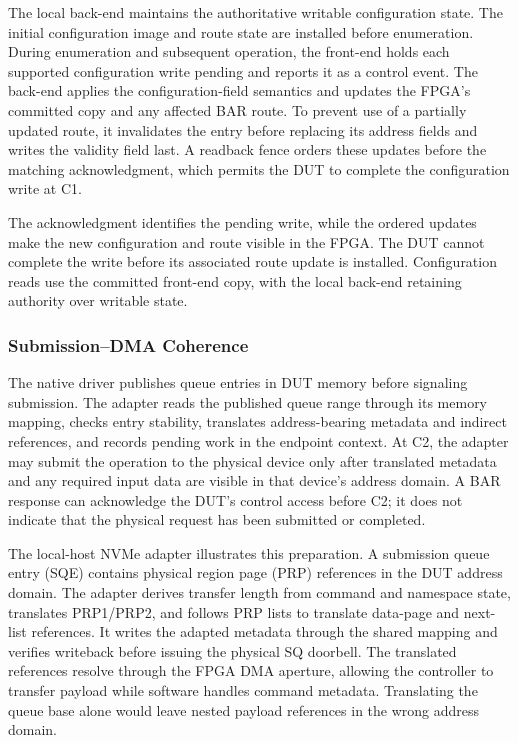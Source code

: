 The local back-end maintains the authoritative writable configuration state.
The initial configuration image and route state are installed before
enumeration. During enumeration and subsequent operation, the front-end holds
each supported configuration write pending and reports it as a control event.
The back-end applies the configuration-field semantics and updates the
FPGA's committed copy and any affected BAR route. To prevent use of a
partially updated route, it invalidates the entry before replacing its
address fields and writes the validity field last. A readback fence orders
these updates before the matching acknowledgment, which permits the DUT
to complete the configuration write at C1.

The acknowledgment identifies the pending write, while the ordered updates
make the new configuration and route visible in the FPGA. The DUT cannot
complete the write before its associated route update is installed.
Configuration reads use the committed front-end copy, with the local
back-end retaining authority over writable state.

\subsubsection{Submission--DMA Coherence}
\label{sec:submission-commit}

The native driver publishes queue entries in DUT memory before signaling
submission. The adapter reads the published queue range through its memory
mapping, checks entry stability, translates address-bearing metadata and
indirect references, and records pending work in the endpoint context.
At C2, the adapter may submit the operation to the physical device only
after translated metadata and any required input data are visible in
that device's address domain. A BAR response can acknowledge the DUT's
control access before C2; it does not indicate that the physical request
has been submitted or completed.

The local-host NVMe adapter illustrates this preparation. A submission queue
entry (SQE) contains physical region page (PRP) references in the DUT address
domain. The adapter derives transfer length from command and namespace state,
translates PRP1/PRP2, and follows PRP lists to translate data-page and
next-list references. It writes the adapted metadata through the shared
mapping and verifies writeback before issuing the physical SQ doorbell.
The translated references resolve through the FPGA DMA aperture, allowing
the controller to transfer payload while software handles command metadata.
Translating the queue base alone would leave nested payload references
in the wrong address domain.

